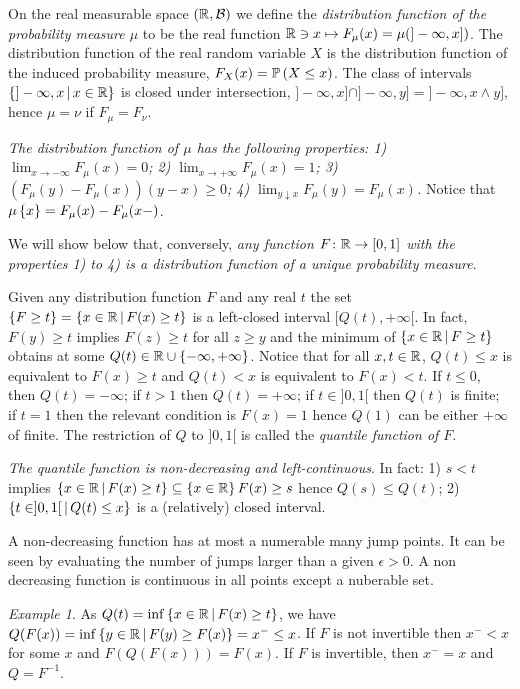 \documentclass[12pt,a4paper]{amsart}
\theoremstyle{plain}%
\theoremstyle{definition}
\theoremstyle{remark}
\newtheorem{example}{Example}
\begin{document}
On the real measurable space $(\mathbb{R},\mathcal B)$ we define the \emph{distribution function of the probability measure $\mu$} to be the real function $\mathbb{R} \ni x \mapsto F_\mu(x) = \mu(]-\infty,x])$. The distribution function of the real random variable $X$ is the distribution function of the induced probability measure, $F_X(x) = \operatorname{\mathbb P}\left(X \leq x\right)$. The class of intervals $\left\{]-\infty,x \, \middle| \, x \in \mathbb{R} \right\}$ is closed under intersection, $]-\infty, x] \cap ]-\infty,y] = ]-\infty,x \wedge y]$, hence $\mu=\nu$ if $F_\mu = F_\nu$.

\emph{The distribution function of $\mu$ has the following properties: 1) $\lim_{x \to -\infty} F_\mu(x) = 0$; 2) $\lim_{x \to +\infty} F_\mu(x) = 1$; 3) $(F_\mu(y) - F_\mu(x))(y-x) \geq 0$; 4) $\lim_{y \downarrow x} F_\mu(y) = F_\mu(x)$.} Notice that $\mu\left\{x\right\} = F_\mu(x) - F_\mu(x-)$.

We will show below that, conversely, \emph{any function $F \colon \mathbb{R} \to [0,1]$ with the properties 1) to 4) is a distribution function of a unique probability measure}.

Given any distribution function $F$ and any real $t$ the set $\left\{F \geq t\right\} = \left\{x \in \mathbb{R} \, \middle| \, F(x) \geq t \right\}$ is a left-closed interval $[Q(t),+\infty[$. In fact, $F(y) \geq t$ implies $F(z) \geq t$ for all $z \geq y$ and the minimum of $\left\{x \in \mathbb{R} \, \middle| \, F \geq t \right\}$ obtains at some $Q(t) \in \mathbb{R} \cup \left\{-\infty,+\infty\right\}$. Notice that for all $x,t \in \mathbb{R}$, $Q(t) \leq x$ is equivalent to $F(x) \geq t$ and $Q(t) < x$ is equivalent to $F(x) < t$. If $t \leq 0$, then $Q(t) = -\infty$; if $t > 1$ then $Q(t) = + \infty$; if $t \in ]0,1[$ then $Q(t)$ is finite; if $t=1$ then the relevant condition is $F(x) = 1$ hence $Q(1)$ can be either $+\infty$ of finite. The restriction of $Q$ to $]0,1[$ is called the \emph{quantile function of $F$}.

\emph{The quantile function is non-decreasing and left-continuous}. In fact: 1) $s < t$ implies $\left\{x\in\mathbb{R} \, \middle| \, F(x) \geq t \right\} \subseteq \left\{x\in\mathbb{R}\right\}{F(x) \geq s}$ hence $Q(s) \leq Q(t)$; 2) $\left\{t \in ]0,1[ \, \middle| \, Q(t) \leq x \right\}$ is a (relatively) closed interval.

A non-decreasing function has at most a numerable many jump points. It can be seen by evaluating the number of jumps larger than a given $\epsilon > 0$. A non decreasing function is continuous in all points except a nuberable set.

\begin{example}
As $Q(t) = \inf\left\{x \in \mathbb{R} \, \middle| \, F(x) \geq t \right\}$, we have $Q(F(x)) = \inf\left\{y \in \mathbb{R} \, \middle| \, F(y) \geq F(x) \right\} = x^- \leq x$. If $F$ is not invertible then $x^- < x$ for some $x$ and $F(Q(F(x))) = F(x)$. If $F$ is invertible, then $x^-=x$ and $Q = F^{-1}$.
\end{example}
\end{document}
